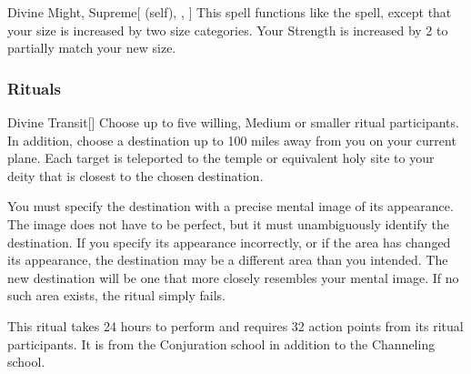 \lowercase{\hypertarget{spell:Divine Might, Supreme}{}}\label{spell:Divine Might, Supreme}
\begin{attuneability}[\nth{7}]{\hypertarget{spell:Divine Might, Supreme}{Divine Might, Supreme}}[ (self), , ]
This spell functions like the  spell, except that your size is increased by two size categories.
Your Strength is increased by 2 to partially match your new size.
\end{attuneability}
\vspace{0.25em}



\subsubsection{Rituals}


\lowercase{\hypertarget{spell:Divine Transit}{}}\label{spell:Divine Transit}
\begin{apability}[\nth{4}]{\hypertarget{spell:Divine Transit}{Divine Transit}}[]
Choose up to five willing, Medium or smaller ritual participants.
In addition, choose a destination up to 100 miles away from you on your current plane.
Each target is teleported to the temple or equivalent holy site to your deity that is closest to the chosen destination.

You must specify the destination with a precise mental image of its appearance.
The image does not have to be perfect, but it must unambiguously identify the destination.
If you specify its appearance incorrectly, or if the area has changed its appearance, the destination may be a different area than you intended.
The new destination will be one that more closely resembles your mental image.
If no such area exists, the ritual simply fails.

This ritual takes 24 hours to perform and requires 32 action points from its ritual participants.
It is from the Conjuration school in addition to the Channeling school.
\end{apability}
\vspace{0.25em}


